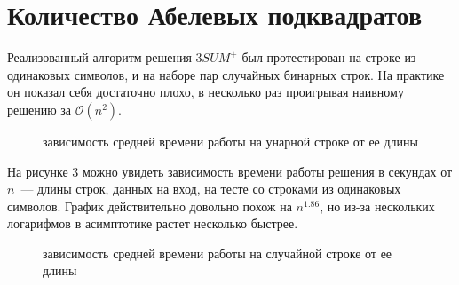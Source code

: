 \section{Количество Абелевых подквадратов}

Реализованный алгоритм решения $3SUM^+$ был протестирован на строке из одинаковых символов, и на наборе пар случайных бинарных строк. На практике он показал себя достаточно плохо, в несколько раз проигрывая наивному решению за $\mathcal{O}(n^2)$.

\begin{figure}[h]
\caption{зависимость средней времени работы на унарной строке от ее длины}
\end{figure}

На рисунке 3 можно увидеть зависимость времени работы решения в секундах от $n$~--- длины строк, данных на вход, на тесте со строками из одинаковых символов. График действительно довольно похож на $n^{1.86}$, но из-за нескольких логарифмов в асимптотике растет несколько быстрее. 

\begin{figure}[h]
\caption{зависимость средней времени работы на случайной строке от ее длины}
\end{figure}

